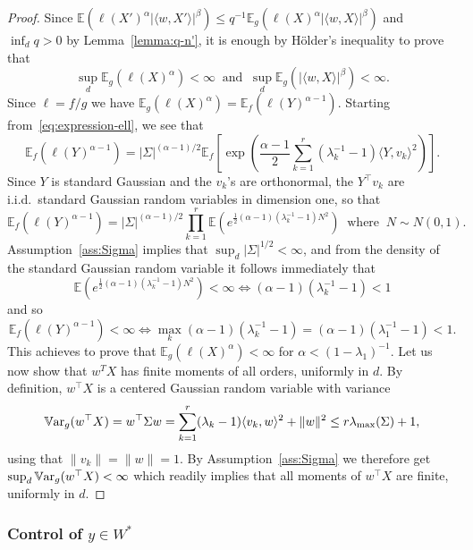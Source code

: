 \documentclass[]{article}
\newcommand{\E}{\mathbb{E}}
\newcommand{\Var}{\mathbb{V}\text{\textnormal{ar}}}
\theoremstyle{plain}
\theoremstyle{definition}
\begin{document}
\begin{proof}
	Since $\E \left( \ell(X')^\alpha \lvert \langle w, X' \rangle \rvert^\beta \right) \leq q^{-1} \E_g \left( \ell(X)^\alpha \lvert \langle w, X \rangle \rvert^\beta \right)$ and $\inf_d q > 0$ by Lemma~\ref{lemma:q-n'}, it is enough by H\"older's inequality to prove that
	\[ \sup_d \E_g \left( \ell(X)^\alpha \right) < \infty \ \text{ and } \ \sup_d \E_g \left( \lvert \langle w, X \rangle \rvert^\beta \right) < \infty. \]
	Since $\ell = f/g$ we have $\E_g(\ell(X)^\alpha) = \E_f(\ell(Y)^{\alpha-1})$. Starting from~\eqref{eq:expression-ell}, we see that
	\[ \E_f(\ell(Y)^{\alpha-1}) = \lvert \Sigma \rvert^{(\alpha-1)/2} \E_f \left[ \exp \left( \frac{\alpha - 1}{2} \sum_{k=1}^r (\lambda_k^{-1}-1) \langle Y, v_k \rangle^2 \right) \right]. \]
	Since $Y$ is standard Gaussian and the $v_k$'s are orthonormal, the $Y^\top v_k$ are i.i.d.\ standard Gaussian random variables in dimension one, so that
	\[ \E_f(\ell(Y)^{\alpha-1}) = \lvert \Sigma \rvert^{(\alpha-1)/2} \prod_{k=1}^r \E \left(e^{ \frac{1}{2} (\alpha - 1)(\lambda_k^{-1} - 1) N^2} \right) \ \text{ where } \ N \sim N(0,1). \]
	Assumption~\ref{ass:Sigma} implies that $\sup_d \lvert \Sigma \rvert^{1/2} < \infty$, and from the density of the standard Gaussian random variable it follows immediately that
	\[ \E \left(e^{\frac{1}{2} (\alpha-1)(\lambda_k^{-1} - 1) N^2} \right) < \infty \Leftrightarrow (\alpha - 1)(\lambda_k^{-1} - 1) < 1 \]
	and so
	\[ \E_f(\ell(Y)^{\alpha-1}) < \infty \Leftrightarrow \max_k (\alpha - 1)(\lambda_k^{-1} - 1) = (\alpha - 1) (\lambda_1^{-1} - 1) < 1. \]
	This achieves to prove that $\E_g(\ell(X)^\alpha) < \infty$ for $\alpha < (1-\lambda_1)^{-1}$. Let us now show that $w^T X$ has finite moments of all orders, uniformly in $d$. By definition, $w^\top X$ is a centered Gaussian random variable with variance
	\[ \Var_g(w^\top X) = w^\top \Sigma w = \sum_{k=1}^r (\lambda_k - 1) \langle v_k, w \rangle^2 + \lVert w \rVert^2 \leq r \lambda_{\max}(\Sigma) + 1, \]
	using that $\lVert v_k \rVert = \lVert w \rVert = 1$. By Assumption~\ref{ass:Sigma} we therefore get $\sup_d \Var_g(w^\top X) < \infty$ which readily implies that all moments of $w^\top X$ are finite, uniformly in $d$.
\end{proof}


\subsubsection{Control of $y \in W^*$} 
\end{document}
